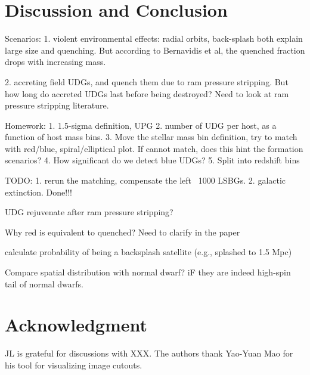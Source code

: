 \documentclass[twocolumn,astrosymb,twocolappendix]{aastex631}
\begin{document}
\begin{CJK*}{UTF8}{gbsn}
\section{Discussion and Conclusion}
Scenarios:
1. violent environmental effects: radial orbits, back-splash both explain large size and quenching. But according to Bernavidis et al, the quenched fraction drops with increasing mass. 

2. accreting field UDGs, and quench them due to ram pressure stripping. But how long do accreted UDGs last before being destroyed? Need to look at ram pressure stripping literature.

Homework:
1. 1.5-sigma definition, UPG
2. number of UDG per host, as a function of host mass bins.
3. Move the stellar mass bin definition, try to match with red/blue, spiral/elliptical plot. If cannot match, does this hint the formation scenarios?
4. How significant do we detect blue UDGs? 
5. Split into redshift bins


TODO:
1. rerun the matching, compensate the left ~1000 LSBGs.
2. galactic extinction. Done!!!

UDG rejuvenate after ram pressure stripping?


Why red is equivalent to quenched? Need to clarify in the paper

calculate probability of being a backsplash satellite (e.g., splashed to 1.5 Mpc)

Compare spatial distribution with normal dwarf? iF they are indeed high-spin tail of normal dwarfs. 




\section*{Acknowledgment}
JL is grateful for discussions with XXX. The authors thank Yao-Yuan Mao for his tool for visualizing image cutouts. 


\end{CJK*}
\end{document}
